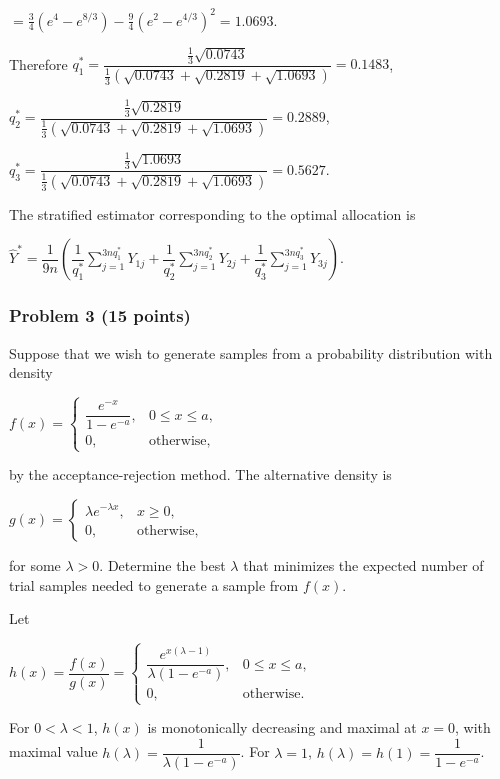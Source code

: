 $=\frac34(e^4-e^{8/3})-\frac94(e^2-e^{4/3})^2=1.0693$.

Therefore
$q_1^*=\dfrac{\frac13\sqrt{0.0743}}{\frac13(\sqrt{0.0743}+\sqrt{0.2819}+\sqrt{1.0693})}=0.1483$,

$q_2^*=\dfrac{\frac13\sqrt{0.2819}}{\frac13(\sqrt{0.0743}+\sqrt{0.2819}+\sqrt{1.0693})}=0.2889$,

$q_3^*=\dfrac{\frac13\sqrt{1.0693}}{\frac13(\sqrt{0.0743}+\sqrt{0.2819}+\sqrt{1.0693})}=0.5627$.

The stratified estimator corresponding to the optimal allocation is

$\widehat Y^*=\dfrac1{9n}\left(
\dfrac1{q_1^*}\sum_{j=1}^{3nq_1^*}Y_{1j}
+\dfrac1{q_2^*}\sum_{j=1}^{3nq_2^*}Y_{2j}
+\dfrac1{q_3^*}\sum_{j=1}^{3nq_3^*}Y_{3j}\right)$.

\subsubsection*{Problem 3 (15 points)}

 Suppose that we wish to generate samples from a probability distribution with density

$f(x)=\begin{cases}\dfrac{e^{-x}}{1-e^{-a}},&0\leq x\leq a,\\0,&\text{otherwise},\end{cases}$

by the acceptance-rejection method. The alternative density is

$g(x)=\begin{cases}\lambda e^{-\lambda x},&x\geq0,\\0,&\text{otherwise},\end{cases}$

for some $\lambda>0$. Determine the best $\lambda$ that minimizes the expected number of trial samples needed to generate a sample from $f(x)$.

 Let

$h(x)=\dfrac{f(x)}{g(x)}=
\begin{cases}
\dfrac{e^{x(\lambda-1)}}{\lambda(1-e^{-a})},&0\leq x\leq a,\\
0,&\text{otherwise}.
\end{cases}$

For $0<\lambda<1$, $h(x)$ is monotonically decreasing and maximal at $x=0$, with maximal value
$h(\lambda)=\dfrac1{\lambda(1-e^{-a})}$.
For $\lambda=1$,
$h(\lambda)=h(1)=\dfrac1{1-e^{-a}}$.

